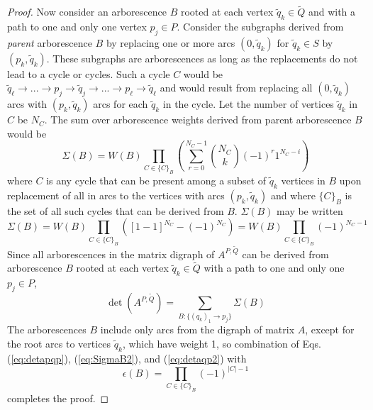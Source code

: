 \documentclass{article}
\begin{document}
\begin{proof}
Now consider an arborescence
$B$ rooted at each vertex $\tilde{q}_k \in \tilde{Q}$
and with a path to one and only one vertex $p_j \in P$.
Consider the subgraphs derived from {\em parent} arborescence
$B$ by replacing one or more
arcs $(0, \tilde{q}_k)$ for $\tilde{q}_k \in S$ by $(p_k, \tilde{q}_k)$.
These subgraphs are arborescences
as long as the replacements do not lead to a cycle or cycles.
Such a cycle $C$ would
be $\tilde{q}_\ell \to ... \to p_j \to \tilde{q}_j \to ... \to p_\ell
\to \tilde{q}_\ell$
and would
result from replacing all $(0, \tilde{q}_k)$ arcs with $(p_k, \tilde{q}_k)$
arcs for each $\tilde{q}_k$ in the cycle.
Let the number of vertices $\tilde{q}_k$ in $C$ be $N_C$.
The sum over arborescence weights derived from parent arborescence
$B$ would be
\begin{equation}
\Sigma(B) = W(B) \prod_{C \in \{C\}_B}
\left(\sum_{r = 0}^{N_C - 1} \binom{N_C}{k}
\left(-1\right)^r 1^{N_C - i}\right)
\label{eq:SigmaB}
\end{equation}
where $C$ is any cycle that can be present among a subset of $\tilde{q}_k$
vertices in $B$ upon replacement of all in arcs to the vertices with
arcs $(p_k, \tilde{q}_k)$ and where $\{C\}_B$ is the set of all such
cycles that can be derived from $B$.  $\Sigma(B)$ may be written
\begin{equation}
\Sigma(B) = W(B) \prod_{C \in \{C\}_B}\left([1 - 1]^{N_C} - \left(-1\right)^{N_C} \right)
= W(B) \prod_{C \in \{C\}_B}\left(-1\right)^{N_C - 1}
\label{eq:SigmaB2}
\end{equation}
Since all arborescences
in the matrix digraph of $A^{P, \tilde{Q}}$ can be derived
from arborescence $B$ rooted at each vertex $\tilde{q}_k \in \tilde{Q}$ with
a path to one and only one $p_j \in P$,
\begin{equation}
\det\left(A^{P, \tilde{Q}}\right) = \sum_{B:\{(q_k)_1 \to p_j\}} \Sigma(B)
\label{eq:detaqp2}
\end{equation}
The arborescences $B$ include only arcs from the digraph of matrix $A$, except
for the root arcs to vertices $\tilde{q}_k$, which have weight 1, so
combination of Eqs. (\ref{eq:detapqp}), (\ref{eq:SigmaB2}),
and (\ref{eq:detaqp2}) with
\begin{equation}
\epsilon(B) = \prod_{C \in \{C\}_B} \left(-1\right)^{\vert C \vert - 1}
\label{eq:epsilonB}
\end{equation}
completes the proof.
\end{proof}
\end{document}
